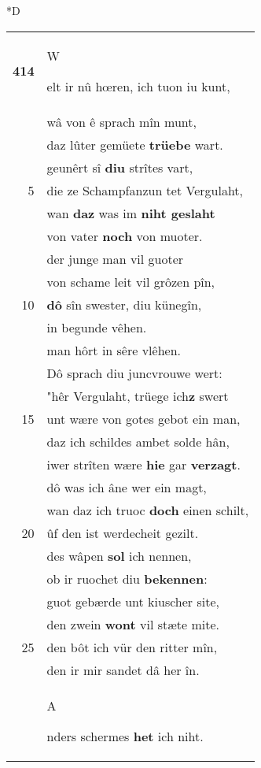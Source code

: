 \documentclass[8pt,a4paper,notitlepage]{article}
\begin{document}
\begin{table}[ht]
\begin{minipage}[t]{0.5\linewidth}
\small
\begin{center}*D
\end{center}
\begin{tabular}{rl}
\textbf{414} & \begin{large}W\end{large}elt ir nû hœren, ich tuon iu kunt,\\ 
 & wâ von ê sprach mîn munt,\\ 
 & daz lûter gemüete \textbf{trüebe} wart.\\ 
 & geunêrt sî \textbf{diu} strîtes vart,\\ 
5 & die ze Schampfanzun tet Vergulaht,\\ 
 & wan \textbf{daz} was im \textbf{niht geslaht}\\ 
 & von vater \textbf{noch} von muoter.\\ 
 & der junge man vil guoter\\ 
 & von schame leit vil grôzen pîn,\\ 
10 & \textbf{dô} sîn swester, diu künegîn,\\ 
 & in begunde vêhen.\\ 
 & man hôrt in sêre vlêhen.\\ 
 & Dô sprach diu juncvrouwe wert:\\ 
 & "hêr Vergulaht, trüege ich\textbf{z} swert\\ 
15 & unt wære von gotes gebot ein man,\\ 
 & daz ich schildes ambet solde hân,\\ 
 & iwer strîten wære \textbf{hie} gar \textbf{verzagt}.\\ 
 & dô was ich âne wer ein magt,\\ 
 & wan daz ich truoc \textbf{doch} einen schilt,\\ 
20 & ûf den ist werdecheit gezilt.\\ 
 & des wâpen \textbf{sol} ich nennen,\\ 
 & ob ir ruochet diu \textbf{bekennen}:\\ 
 & guot gebærde unt kiuscher site,\\ 
 & den zwein \textbf{wont} vil stæte mite.\\ 
25 & den bôt ich vür den ritter mîn,\\ 
 & den ir mir sandet dâ her în.\\ 
 & \begin{large}A\end{large}nders schermes \textbf{het} ich niht.\\ 

\end{tabular}
\end{minipage}
\end{table}
\end{document}

